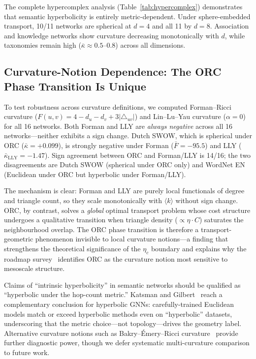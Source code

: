 \documentclass[11pt,a4paper]{article}
\newcommand{\kbar}{\bar{\kappa}}
\newcommand{\kavg}{\langle k \rangle}
\begin{document}
The complete hypercomplex analysis (Table~\ref{tab:hypercomplex}) demonstrates that semantic hyperbolicity is entirely metric-dependent. Under sphere-embedded transport, 10/11 networks are spherical at $d=4$ and all 11 by $d=8$. Association and knowledge networks show curvature decreasing monotonically with $d$, while taxonomies remain high ($\kbar \approx 0.5$--$0.8$) across all dimensions. \subsection{Curvature-Notion Dependence: The ORC Phase Transition Is Unique}

To test robustness across curvature definitions, we computed Forman--Ricci curvature ($F(u,v) = 4 - d_u - d_v + 3|\triangle_{uv}|$) and Lin--Lu--Yau curvature ($\alpha=0$)~\cite{lin2011ricci} for all 16 networks. Both Forman and LLY are \emph{always negative} across all 16 networks---neither exhibits a sign change. Dutch SWOW, which is spherical under ORC ($\kbar = +0.099$), is strongly negative under Forman ($\bar{F} = -95.5$) and LLY ($\bar{\kappa}_{\mathrm{LLY}} = -1.47$). Sign agreement between ORC and Forman/LLY is 14/16; the two disagreements are Dutch SWOW (spherical under ORC only) and WordNet EN (Euclidean under ORC but hyperbolic under Forman/LLY).

The mechanism is clear: Forman and LLY are purely local functionals of degree and triangle count, so they scale monotonically with $\kavg$ without sign change. ORC, by contrast, solves a \emph{global} optimal transport problem whose cost structure undergoes a qualitative transition when triangle density ($\propto \eta \cdot C$) saturates the neighbourhood overlap. The ORC phase transition is therefore a transport-geometric phenomenon invisible to local curvature notions---a finding that strengthens the theoretical significance of the $\eta_c$ boundary and explains why the roadmap survey~\cite{samal2025roadmap} identifies ORC as the curvature notion most sensitive to mesoscale structure.

Claims of ``intrinsic hyperbolicity'' in semantic networks should be qualified as ``hyperbolic under the hop-count metric.'' Katsman and Gilbert~\cite{katsman2025microscope} reach a complementary conclusion for hyperbolic GNNs: carefully-trained Euclidean models match or exceed hyperbolic methods even on ``hyperbolic'' datasets, underscoring that the metric choice---not topology---drives the geometry label. Alternative curvature notions such as Bakry--\'Emery--Ricci curvature~\cite{bakryemery2024} provide further diagnostic power, though we defer systematic multi-curvature comparison to future work.
\end{document}
